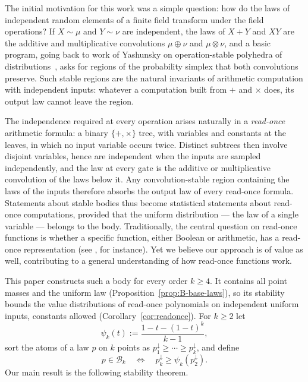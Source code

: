 \documentclass[11pt]{article}
\theoremstyle{definition}
\theoremstyle{remark}
\newcommand{\body}{\mathcal{B}}
\newcommand{\down}{\downarrow}
\begin{document}
The initial motivation for this work was a simple question: how do
the laws of independent random elements of a finite field transform
under the field operations?  If $X\sim\mu$ and $Y\sim\nu$ are
independent, the laws of $X+Y$ and $XY$ are the additive and
multiplicative convolutions $\mu\oplus\nu$ and $\mu\otimes\nu$, and a
basic program, going back to work of Yashunsky on operation-stable
polyhedra of distributions~\cite{yashunsky2015, yashunskii2017}, asks for regions of
the probability simplex that both convolutions preserve.  Such stable
regions are the natural invariants of arithmetic computation with
independent inputs: whatever a computation built from $+$ and $\times$
does, its output law cannot leave the region.

The independence required at every operation arises naturally in a
\emph{read-once} arithmetic formula: a binary $\{+,\times\}$ tree, with
variables and constants at the leaves, in which no input variable occurs
twice.  Distinct subtrees then involve
disjoint variables, hence are independent when the inputs are sampled
independently, and the law at every gate is the additive or
multiplicative convolution of the laws below it.  Any
convolution-stable region containing the laws of the inputs therefore
absorbs the output law of every read-once formula.  Statements about
stable bodies thus become statistical statements about read-once
computations, provided that the uniform distribution --- the law of a
single variable --- belongs to the body. Traditionally, the central
question on read-once functions is whether a specific function, either Boolean
or arithmetic, has a read-once representation (see \cite{golumbic2011,volkovich2016},
for instance). Yet we believe our approach is of value as well,
contributing to a general understanding of how read-once functions work.

This paper constructs such a body for every order $k\ge4$.  It contains
all point masses and the uniform law (Proposition~\ref{prop:B-base-laws}),
so its stability bounds the value distributions of read-once polynomials
on independent uniform inputs, constants allowed
(Corollary~\ref{cor:readonce}).  For $k\ge2$ let
\begin{equation}\label{eq:psi-def}
  \psi_k(t):=\frac{1-t-(1-t)^k}{k-1},
\end{equation}
sort the atoms of a law $p$ on $k$ points as
$p_1^\down\ge\cdots\ge p_k^\down$, and define
\begin{equation}\label{eq:Bq-def}
  p\in\body_k\quad\Longleftrightarrow\quad
  p_k^\down\ge\psi_k(p_2^\down).
\end{equation}
Our main result is the following stability theorem.
\end{document}
